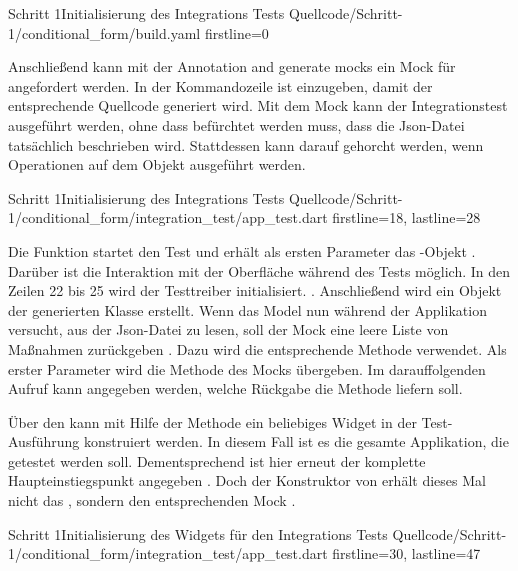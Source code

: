 \begin{alexyamllisting}{Schritt 1}{Initialisierung des Integrations Tests}
  {Quellcode/Schritt-1/conditional_form/build.yaml}
  {firstline=0}
  \label{lst:Schritt1IntegrationsTestInitialisierung}
\end{alexyamllisting}

Anschließend kann mit der Annotation and generate mocks  ein Mock für  angefordert werden. In der Kommandozeile ist  einzugeben, damit der entsprechende Quellcode generiert wird. Mit dem Mock kann der Integrationstest ausgeführt werden, ohne dass befürchtet werden muss, dass die Json-Datei tatsächlich beschrieben wird. Stattdessen kann darauf gehorcht werden, wenn Operationen auf dem Objekt ausgeführt werden. 

\begin{alexlisting}{Schritt 1}{Initialisierung des Integrations Tests}
  {Quellcode/Schritt-1/conditional_form/integration_test/app_test.dart}
  {firstline=18, lastline=28}
  \label{lst:Schritt1IntegrationsTestInitialisierung}
\end{alexlisting}

Die Funktion  startet den Test und erhält als ersten Parameter das -Objekt . Darüber ist die Interaktion mit der Oberfläche während des Tests möglich. In den Zeilen 22 bis 25 wird der Testtreiber initialisiert. . Anschließend wird ein Objekt der generierten Klasse  erstellt. Wenn das Model nun während der Applikation versucht, aus der Json-Datei zu lesen, soll der Mock eine leere Liste von Maßnahmen zurückgeben . Dazu wird die entsprechende Methode  verwendet. Als erster Parameter wird die Methode  des Mocks übergeben. Im darauffolgenden Aufruf  kann angegeben werden, welche Rückgabe die Methode liefern soll.

Über den  kann mit Hilfe der Methode  ein beliebiges Widget in der Test-Ausführung konstruiert werden. In diesem Fall ist es die gesamte Applikation, die getestet werden soll. Dementsprechend ist  hier erneut der komplette Haupteinstiegspunkt angegeben \Lst{\ref{lst:Schritt1IntegrationsTestWidgetInitialisierung}}. Doch der Konstruktor von  erhält dieses Mal nicht das , sondern den entsprechenden Mock . 

\begin{alexlisting}{Schritt 1}{Initialisierung des Widgets für den Integrations Tests}
  {Quellcode/Schritt-1/conditional_form/integration_test/app_test.dart}
  {firstline=30, lastline=47}
  \label{lst:Schritt1IntegrationsTestWidgetInitialisierung}
\end{alexlisting}



